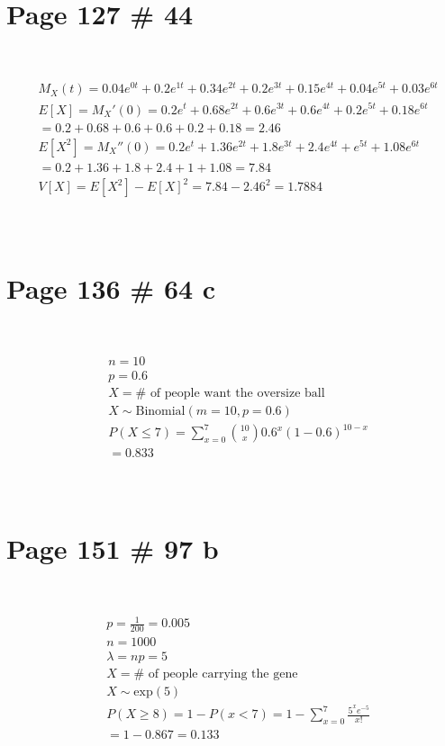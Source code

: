\documentclass{article}
\begin{document}
~

\section*{Page 127 \# 44}

~

\begin{align*}
    &M_X(t)=0.04e^{0t}+0.2e^{1t}+0.34e^{2t}+0.2e^{3t}+0.15e^{4t}+0.04e^{5t}+0.03e^{6t}\\
    &E[X]={M_X}'(0)=0.2e^t+0.68e^{2t}+0.6e^{3t}+0.6e^{4t}+0.2e^{5t}+0.18e^{6t}\\
    &=0.2+0.68+0.6+0.6+0.2+0.18=2.46\\
    &E[X^2]={M_X}''(0)=0.2e^t+1.36e^{2t}+1.8e^{3t}+2.4e^{4t}+e^{5t}+1.08e^{6t}\\
    &=0.2+1.36+1.8+2.4+1+1.08=7.84\\
    &V[X]=E[X^2]-{E[X]}^2=7.84-2.46^2=1.7884\\
\end{align*}

~

\section*{Page 136 \# 64 c}

~

\begin{align*}
    &n=10\\
    &p=0.6\\
    &X=\# \text{ of people want the oversize ball}\\
    &X\sim \text{Binomial}(m=10,p=0.6)\\
    &P(X\leqslant 7)=\sum_{x=0}^{7}\binom{10}{x}0.6^x(1-0.6)^{10-x}\\
    &=0.833\\
\end{align*}

~

\section*{Page 151 \# 97 b}

~

\begin{align*}
    &p=\frac{1}{200}=0.005\\
    &n=1000\\
    &\lambda =np=5\\
    &X=\# \text{ of people carrying the gene}\\
    &X\sim \text{exp}(5)\\
    &P(X\geqslant 8)=1-P(x<7)=1-\sum_{x=0}^{7}\frac{5^xe^{-5}}{x!}\\
    &=1-0.867=0.133\\
\end{align*}
\end{document}
